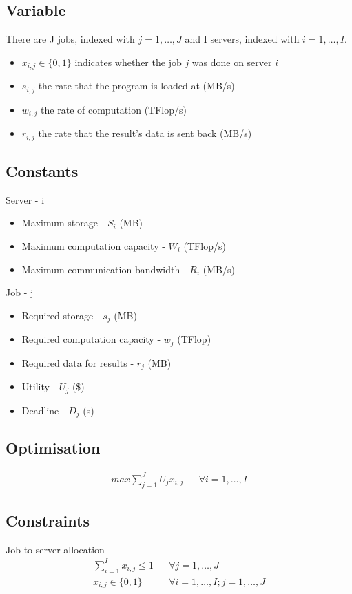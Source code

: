 \subsection{Variable}\label{subsec:variable}
There are J jobs, indexed with $ j = 1,\dots,J $ and I servers, indexed with $ i = 1,\dots,I $.
\begin{itemize}
    \item $ x_{i,j} \in \{0, 1\}$ indicates whether the job $j$ was done on server $i$
    \item $ s_{i,j} $ the rate that the program is loaded at (MB/s)
    \item $ w_{i,j} $ the rate of computation (TFlop/s)
    \item $ r_{i,j} $ the rate that the result's data is sent back (MB/s)
\end{itemize}

\subsection{Constants}\label{subsec:constants}
Server - i
\begin{itemize}
    \item Maximum storage - $ S_i $ (MB)
    \item Maximum computation capacity - $ W_i $ (TFlop/s)
    \item Maximum communication bandwidth - $ R_i $ (MB/s)
\end{itemize}
Job - j
\begin{itemize}
    \item Required storage - $ s_j $ (MB)
    \item Required computation capacity - $ w_j $ (TFlop)
    \item Required data for results - $ r_j $ (MB)
    \item Utility - $ U_j $ (\$)
    \item Deadline - $ D_j $ (s)
\end{itemize}

\subsection{Optimisation}\label{subsec:optimisation}
\begin{align}
    max \sum_{j=1}^{J} U_j x_{i,j} && \forall i = 1,\dots,I
\end{align}

\subsection{Constraints}\label{subsec:constraints}
Job to server allocation
\begin{align}
    \sum_{i=1}^I x_{i,j} \leq 1 && \forall j = 1,\dots,J \\
    x_{i,j} \in \{0, 1\} && \forall i = 1,\dots,I; j = 1,\dots,J
\end{align}

